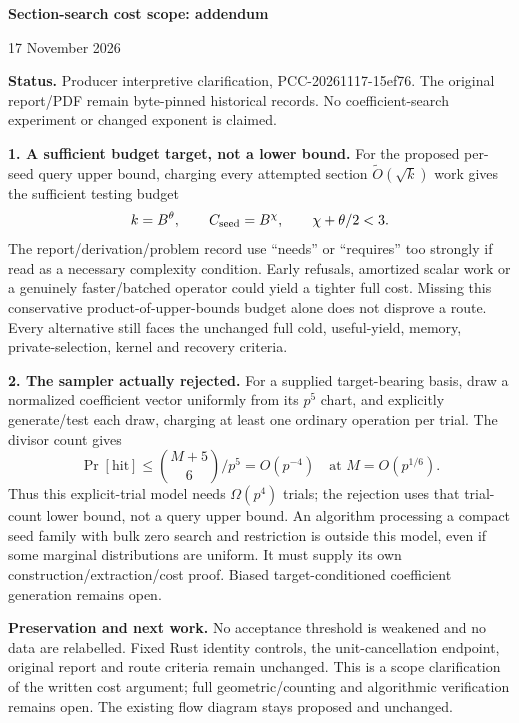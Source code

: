 \documentclass[11pt]{article}
\begin{document}
\begin{center}{\Large\bfseries Section-search cost scope: addendum}\par
17 November 2026\end{center}
\textbf{Status.} Producer interpretive clarification, PCC-20261117-15ef76.
The original report/PDF remain byte-pinned historical records.
No coefficient-search experiment or changed exponent is claimed.

\textbf{1. A sufficient budget target, not a lower bound.}
For the proposed per-seed query upper bound, charging every attempted
section \(\widetilde O(\sqrt k)\) work gives the sufficient testing budget
\[
k=B^\theta,\qquad C_{\rm seed}=B^\chi,\qquad \chi+\theta/2<3.
\]
The report/derivation/problem record use ``needs'' or ``requires'' too
strongly if read as a necessary complexity condition. Early refusals,
amortized scalar work or a genuinely faster/batched operator could yield
a tighter full cost. Missing this conservative product-of-upper-bounds
budget alone does not disprove a route. Every alternative still faces the
unchanged full cold, useful-yield, memory, private-selection, kernel and
recovery criteria.

\textbf{2. The sampler actually rejected.}
For a supplied target-bearing basis, draw a normalized coefficient vector
uniformly from its \(p^5\) chart, and explicitly generate/test each draw,
charging at least one ordinary operation per trial. The divisor count gives
\[
\Pr[\text{hit}]\le\binom{M+5}{6}/p^5=O(p^{-4})
\quad\text{at }M=O(p^{1/6}).
\]
Thus this explicit-trial model needs \(\Omega(p^4)\) trials; the rejection
uses that trial-count lower bound, not a query upper bound.
An algorithm processing a compact seed family with bulk zero search and
restriction is outside this model, even if some marginal distributions
are uniform. It must supply its own construction/extraction/cost proof.
Biased target-conditioned coefficient generation remains open.

\textbf{Preservation and next work.}
No acceptance threshold is weakened and no data are relabelled. Fixed Rust
identity controls, the unit-cancellation endpoint, original report and route
criteria remain unchanged. This is a scope clarification of the written
cost argument; full geometric/counting and algorithmic verification remains
open. The existing flow diagram stays proposed and unchanged.
\end{document}
